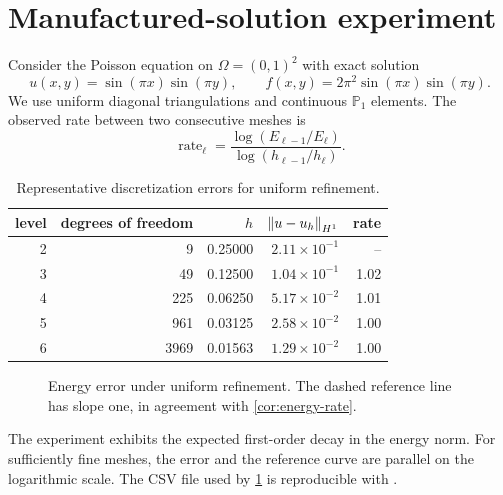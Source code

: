 \section{Manufactured-solution experiment}
\label{sec:numerics}

Consider the Poisson equation on $\Omega=(0,1)^2$ with exact solution
\begin{equation}
  u(x,y)=\sin(\pi x)\sin(\pi y),
  \qquad
  f(x,y)=2\pi^2\sin(\pi x)\sin(\pi y).
  \label{eq:manufactured-solution}
\end{equation}
We use uniform diagonal triangulations and continuous $\mathbb P_1$ elements.
The observed rate between two consecutive meshes is
\begin{equation}
  \operatorname{rate}_\ell
  =\frac{\log(E_{\ell-1}/E_\ell)}{\log(h_{\ell-1}/h_\ell)}.
  \label{eq:observed-rate}
\end{equation}

\begin{table}[ht]
  \centering
  \caption{Representative discretization errors for uniform refinement.}
  \label{tab:convergence}
  \begin{tabular}{rrrrr}
    \toprule
    level & degrees of freedom & $h$ & $\left\lVert u-u_h \right\rVert_{H^1}$ & rate \\
    \midrule
    2 & 9    & 0.25000 & $2.11\times10^{-1}$ & --   \\
    3 & 49   & 0.12500 & $1.04\times10^{-1}$ & 1.02 \\
    4 & 225  & 0.06250 & $5.17\times10^{-2}$ & 1.01 \\
    5 & 961  & 0.03125 & $2.58\times10^{-2}$ & 1.00 \\
    6 & 3969 & 0.01563 & $1.29\times10^{-2}$ & 1.00 \\
    \bottomrule
  \end{tabular}
\end{table}

\begin{figure}[ht]
  \centering
  
  \caption{Energy error under uniform refinement. The dashed reference line
  has slope one, in agreement with \cref{cor:energy-rate}.}
  \label{fig:convergence}
\end{figure}

The experiment exhibits the expected first-order decay in the energy norm.
For sufficiently fine meshes, the error and the reference curve are parallel
on the logarithmic scale. The CSV file used by \cref{fig:convergence} is
reproducible with .
